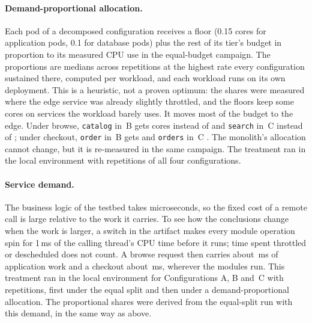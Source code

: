 \paragraph{Demand-proportional allocation.} Each pod of a decomposed configuration receives a floor (0.15 cores
for application pods, 0.1 for database pods) plus the rest of its tier's budget in proportion to its measured CPU
use in the equal-budget campaign. The proportions are medians across repetitions at the highest rate every
configuration sustained there, computed per workload, and each workload runs on its own deployment. This is a
heuristic, not a proven optimum: the shares were measured where the edge service was already slightly throttled,
and the floors keep some cores on services the workload barely uses. It moves most of the budget to the edge. Under
browse, \texttt{catalog} in~B gets  cores instead of  and \texttt{search}
in~C  instead of ; under checkout, \texttt{order} in~B gets
 and \texttt{orders} in~C . The monolith's allocation cannot
change, but it is re-measured in the same campaign. The treatment ran in the local environment with
 repetitions of all four configurations.

\paragraph{Service demand.} The business logic of the testbed takes microseconds, so the fixed cost of a remote call
is large relative to the work it carries. To see how the conclusions change when the work is larger, a switch in
the artifact makes every module operation spin for 1\,ms of the calling thread's CPU time before it runs; time
spent throttled or descheduled does not count. A browse request then carries about \,ms
of application work and a checkout about \,ms, wherever the modules run. This
treatment ran in the local environment for Configurations A, B and~C with  repetitions, first under
the equal split and then under a demand-proportional allocation. The proportional shares were derived from the
equal-split run with this demand, in the same way as above.

